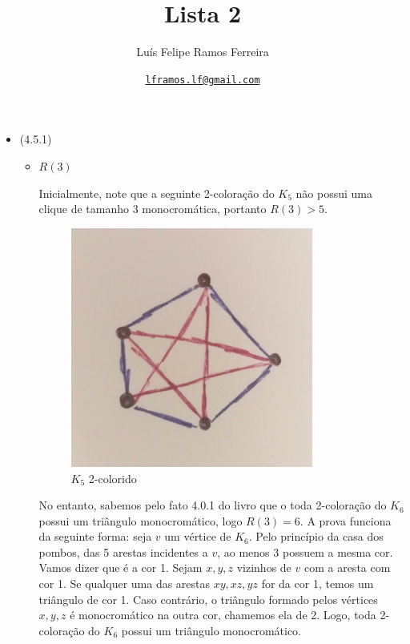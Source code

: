 \documentclass{article}
\title{Lista 2}
\author{Luís Felipe Ramos Ferreira}
\date{\href{mailto:lframos.lf@gmail.com}{\texttt{lframos.lf@gmail.com}}
}
\begin{document}
\maketitle

\begin{itemize}
	\item (4.5.1)
	      \begin{itemize}
		      \item \(R(3)\)

		            Inicialmente, note que a seguinte 2-coloração do \(K_5\) não possui uma clique de tamanho 3 monocromática, portanto
		            \(R(3) > 5\).

		            \begin{figure}[H]
			            \centering
			            \includegraphics[width=0.8\textwidth]{images/1a.jpeg}
			            \caption{\(K_5\) 2-colorido}
		            \end{figure}

		            No entanto, sabemos pelo fato 4.0.1 do livro que o toda 2-coloração do \(K_6\) possui um triângulo monocromático, logo \(R(3) = 6\).
		            A prova funciona da seguinte forma: seja \(v\) um vértice de \(K_6\). Pelo princípio da casa dos pombos, das 5 arestas incidentes a \(v\),
		            ao menos 3 possuem a mesma cor. Vamos dizer que é a cor 1. Sejam \(x, y, z\) vizinhos de \(v\) com a aresta com cor 1. Se qualquer uma das arestas
		            \(xy, xz, yz\) for da cor 1, temos um triângulo de cor 1. Caso contrário, o triângulo formado pelos vértices \(x, y, z\) é monocromático na outra cor,
		            chamemos ela de 2. Logo, toda 2-coloração do \(K_6\) possui um triângulo monocromático.


\end{itemize}
\end{itemize}
\end{document}
